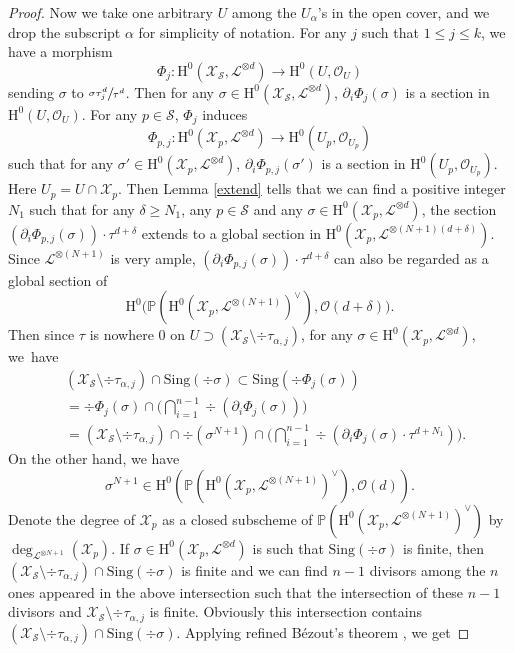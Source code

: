 \documentclass[JEP,XML,SOM,Unicode,published]{cedram}
\theoremstyle{plain}
\theoremstyle{definition}
\newcommand{\ho}{\mathrm{H}}
\newcommand{\X}{\mathcal{X}}
\newcommand{\li}{\mathcal{L}}
\newcommand{\pr}{\mathbb{P}}
\begin{document}
\begin{proof}
Now we take one arbitrary $U$ among the $U_{\alpha}$'s in the open cover, and we drop the subscript $\alpha$ for simplicity of notation. For any $j$ such that $1\leq j\leq k$, we have a morphism
\[
\Phi_{j}: \ho^0(\X_{\mathcal{S}}, \li^{\otimes d}) \to \ho^0(U,\mathcal{O}_{U})
\]
sending $\sigma$ to $\sfrac{\sigma\tau_{j}^{d}}{\tau^{d}}$. Then for any $\sigma\in \ho^0(\X_{\mathcal{S}}, \li^{\otimes d})$, $\partial_{i}\Phi_{j}(\sigma)$ is a section in $\ho^0(U,\mathcal{O}_{U})$. For any $p\in \mathcal{S}$, $\Phi_{j}$ induces
\[
\Phi_{p,j}: \ho^0(\X_{p}, \li^{\otimes d}) \to \ho^0(U_p,\mathcal{O}_{U_p})
\] such that for any $\sigma'\in \ho^0(\X_{p}, \li^{\otimes d})$, $\partial_{i}\Phi_{p,j}(\sigma')$ is a section in $\ho^0(U_p,\mathcal{O}_{U_p})$. Here $U_p=U\cap \X_p$. Then Lemma \ref{extend} tells that we can find a positive integer $N_1$ such that for any $\delta\geq N_1$, any $p\in \mathcal{S}$ and any $\sigma\in \ho^0(\X_{p}, \li^{\otimes d})$, the section $\left(\partial_i \Phi_{p,j}(\sigma) \right)\cdot \tau^{d+\delta}$ extends to a global section in $\ho^0(\X_p, \li^{\otimes (N+1)(d+\delta)})$. Since $\li^{\otimes (N+1)}$ is very ample, $\left(\partial_i \Phi_{p,j}(\sigma) \right)\cdot \tau^{d+\delta}$ can also be regarded as a global section of
\[
\ho^0\bigl(\pr(\ho^0(\X_{p}, \li^{\otimes (N+1)})^{\vee}), \mathcal{O}(d+\delta)\bigr).
\]
Then since $\tau$ is nowhere $0$ on $U\supset \left(\X_{\mathcal{S}}\setminus \div \tau_{\alpha,j}\right)$, for any $\sigma\in \ho^0(\X_{p}, \li^{\otimes d})$, we~have
\begin{align*}
&\left(\X_{\mathcal{S}}\setminus \div \tau_{\alpha,j}\right)\cap \mathrm{Sing}(\div \sigma)\subset \mathrm{Sing}(\div \Phi_j(\sigma)) \\
&=\div \Phi_j(\sigma)\cap \biggl(\bigcap_{i=1}^{n-1}\div \left(\partial_i \Phi_j(\sigma) \right)\biggr) \\
&= \left(\X_{\mathcal{S}}\setminus \div \tau_{\alpha,j}\right)\cap \div (\sigma^{N+1})\cap \biggl(\bigcap_{i=1}^{n-1}\div \left(\partial_i \Phi_j(\sigma) \cdot \tau^{d+N_1} \right)\biggr).
\end{align*}
On the other hand, we have
\[
\sigma^{N+1}\in \ho^0(\pr(\ho^0(\X_p, \li^{\otimes (N+1)})^{\vee}), \mathcal{O}(d)).
\]
Denote the degree of $\X_p$ as a closed subscheme of $\pr(\ho^0(\X_p, \li^{\otimes (N+1)})^{\vee})$ by $\deg_{\li^{\otimes N+1}}(\X_p)$. If $\sigma\in \ho^0(\X_{p}, \li^{\otimes d})$ is such that $\mathrm{Sing}(\div \sigma)$ is finite, then $\left(\X_{\mathcal{S}}\setminus \div \tau_{\alpha,j}\right)\cap \mathrm{Sing}(\div \sigma)$ is finite and we can find $n-1$ divisors among the $n$ ones appeared in the above intersection such that the intersection of these $n-1$ divisors and $ \X_{\mathcal{S}}\setminus \div \tau_{\alpha,j}$ is finite. Obviously this intersection contains $\left(\X_{\mathcal{S}}\setminus \div \tau_{\alpha,j}\right)\cap \mathrm{Sing}(\div \sigma)$. Applying refined Bézout's theorem \cite[Th.\,12.3]{Fu84}, we get

\end{proof}
\end{document}

